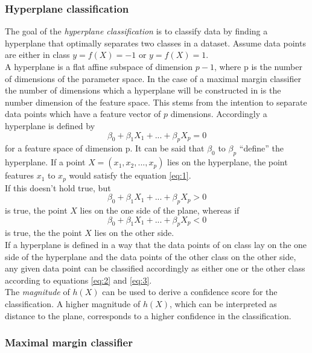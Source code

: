 \subsubsection*{Hyperplane classification}
The goal of the \emph{hyperplane classification} is to classify data by finding a hyperplane that optimally separates two classes in a dataset. Assume data points are either in class $y=f(X)=-1$ or $y=f(X)=1$. 
\\
A hyperplane is a flat affine subspace of dimension $p-1$, where p is the number of dimensions of the parameter space. In the case of a maximal margin classifier the number of dimensions which a hyperplane will be constructed in is the number dimension of the feature space. This stems from the intention to separate data points which have a feature vector of $p$ dimensions. Accordingly a hyperplane is defined by
\begin{equation} \label{eq:1}
\beta_0 + \beta_1 X_1 + ... + \beta_p X_p = 0
\end{equation}
for a feature space of dimension p. It can be said that $\beta_0$  to $\beta_p$ ``define'' the hyperplane.
If a point $X=(x_1,x_2,...,x_p)$ lies on the hyperplane, the point features $x_1$ to $x_p$ would satisfy the equation \ref{eq:1}.
\\
If this doesn't hold true, but
\begin{equation} \label{eq:2}
\beta _0 + \beta _1 X_1 + ... + \beta_p X_p > 0
\end{equation}
is true, the point $X$ lies on the one side of the plane, whereas if 
\begin{equation} \label{eq:3}
\beta_0 + \beta_1 X_1 + ... + \beta_p X_p < 0
\end{equation}
is true, the the point $X$ lies on the other side. 
\\
If a hyperplane is defined in a way that the data points of on class lay on the one side of the hyperplane and the data points of the other class on the other side, any given data point can be classified accordingly as either one or the other class according to equations \ref{eq:2} and \ref{eq:3}.
\\
The \emph{magnitude} of $h(X)$ can be used to derive a confidence score for the classification. A higher magnitude of $h(X)$, which can be interpreted as distance to the plane, corresponds to a higher confidence in the classification.


\subsubsection*{Maximal margin classifier}

